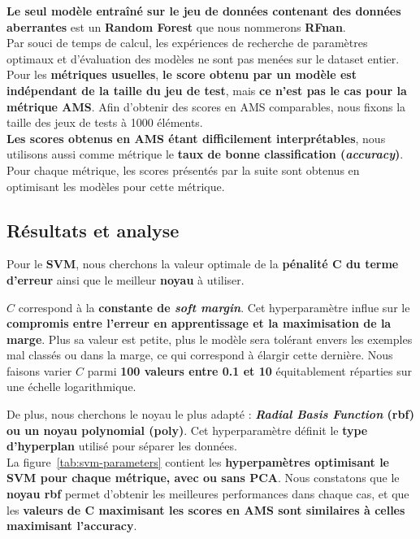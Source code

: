 \documentclass[12pt]{article}
\newcommand{\figref}[1]{figure~\ref{#1}}
\begin{document}
\textbf{Le seul modèle entraîné sur le jeu de données contenant des données
aberrantes} est un \textbf{Random Forest} que nous nommerons \textbf{RFnan}. \\

Par souci de temps de calcul, les expériences de recherche de paramètres
optimaux et d'évaluation des modèles ne sont pas menées sur le dataset entier.
Pour les \textbf{métriques usuelles}, \textbf{le score obtenu par un modèle est
indépendant de la taille du jeu de test}, mais \textbf{ce n'est pas le cas pour
la métrique AMS}.  Afin d'obtenir des scores en AMS comparables, nous fixons la
taille des jeux de tests à 1000 éléments. \\

\textbf{Les scores obtenus en AMS étant difficilement interprétables}, nous
utilisons aussi comme métrique le \textbf{taux de bonne classification
(\emph{accuracy})}. Pour chaque métrique, les scores présentés par la suite sont
obtenus en optimisant les modèles pour cette métrique.

\subsection{Résultats et analyse}

Pour le \textbf{SVM}, nous cherchons la valeur optimale de la \textbf{pénalité
$\bm{C}$ du terme d'erreur} ainsi que le meilleur \textbf{noyau} à utiliser. 

$C$ correspond à la \textbf{constante de \emph{soft margin}}. Cet hyperparamètre
influe sur le \textbf{compromis entre l'erreur en apprentissage et la
maximisation de la marge}.  Plus sa valeur est petite, plus le modèle sera
tolérant envers les exemples mal classés ou dans la marge, ce qui correspond à
élargir cette dernière. Nous faisons varier $C$ parmi \textbf{100 valeurs entre
0.1 et 10} équitablement réparties sur une échelle logarithmique.

De plus, nous cherchons le noyau le plus adapté : \textbf{\emph{Radial Basis
Function} (rbf) ou un noyau polynomial (poly)}. Cet hyperparamètre définit le
\textbf{type d'hyperplan} utilisé pour séparer les données.  \\

La \figref{tab:svm-parameters} contient les \textbf{hyperpamètres optimisant le
SVM pour chaque métrique, avec ou sans PCA}. Nous constatons que le
\textbf{noyau rbf} permet d'obtenir les meilleures performances dans chaque cas,
et que les \textbf{valeurs de $\bm{C}$ maximisant les scores en AMS sont similaires à celles
maximisant l'accuracy}.\\
\end{document}
